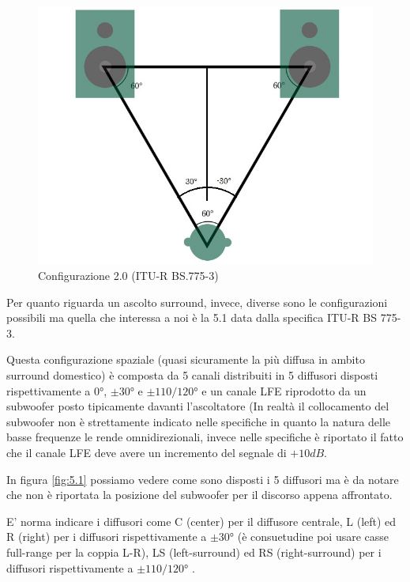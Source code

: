 \documentclass[12pt,a4paper]{report}
\begin{document}
\begin{figure}[htbp]
	\centering
	\includegraphics[scale=0.50]{figures/2-0.jpg}
	\caption {Configurazione 2.0 (ITU-R BS.775-3)}
	\label{fig:2.0}
	\end{figure}
	
Per quanto riguarda un ascolto surround, invece, diverse sono le configurazioni possibili ma quella che interessa a noi è la 5.1 data dalla specifica ITU-R BS 775-3\cite{5.1}.

Questa configurazione spaziale (quasi sicuramente la più diffusa in ambito surround domestico) è composta da 5 canali distribuiti in 5 diffusori disposti rispettivamente a $0°$, $\pm30°$ e $\pm110/120°$ e un canale LFE riprodotto da un subwoofer posto tipicamente davanti l'ascoltatore (In realtà il collocamento del subwoofer non è strettamente indicato nelle specifiche in quanto la natura delle basse frequenze le rende omnidirezionali, invece nelle specifiche è riportato il fatto che il canale LFE deve avere un incremento del segnale di $+10dB$.

In figura \ref{fig:5.1} possiamo vedere come sono disposti i 5 diffusori ma è da notare che non è riportata la posizione del subwoofer per il discorso appena affrontato.

E' norma indicare i diffusori come C (center) per il diffusore centrale, L (left) ed R (right) per i diffusori rispettivamente a $\pm30°$ (è consuetudine poi usare casse full-range per la coppia L-R), LS (left-surround) ed RS (right-surround) per i diffusori rispettivamente a $\pm110/120°$ .
\end{document}
